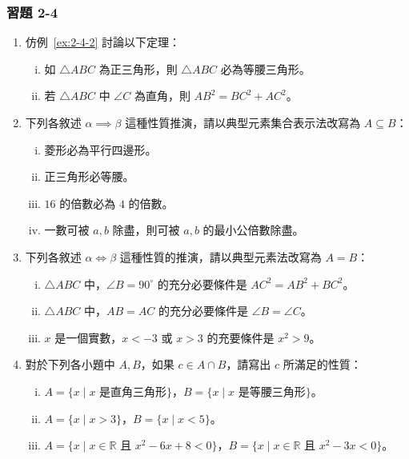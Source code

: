 \subsubsection*{習題 2-4}\label{sec:ex2-4}

\begin{enumerate}[1., leftmargin=2em]
  \item 仿例~\ref{ex:2-4-2} 討論以下定理：
  \begin{enumerate}[(i)]
    \item 如 $\triangle ABC$ 為正三角形，則 $\triangle ABC$ 必為等腰三角形。
    \item 若 $\triangle ABC$ 中 $\angle C$ 為直角，則 $AB^2 = BC^2 + AC^2$。
  \end{enumerate}
  \item 下列各敘述 $\alpha \implies \beta$ 這種性質推演，請以典型元素集合表示法改寫為 $A \subseteq B$：
  \begin{enumerate}[(i)]
    \item 菱形必為平行四邊形。
    \item 正三角形必等腰。
    \item $16$ 的倍數必為 $4$ 的倍數。
    \item 一數可被 $a, b$ 除盡，則可被 $a, b$ 的最小公倍數除盡。
  \end{enumerate}
  \item 下列各敘述 $\alpha \iff \beta$ 這種性質的推演，請以典型元素法改寫為 $A = B$：
  \begin{enumerate}[(i)]
    \item $\triangle ABC$ 中，$\angle B = 90^\circ$ 的充分必要條件是 $AC^2 = AB^2 + BC^2$。
    \item $\triangle ABC$ 中，$AB = AC$ 的充分必要條件是 $\angle B = \angle C$。
    \item $x$ 是一個實數，$x < -3$ 或 $x > 3$ 的充要條件是 $x^2 > 9$。
  \end{enumerate}
  \item 對於下列各小題中 $A, B$，如果 $c \in A \cap B$，請寫出 $c$ 所滿足的性質：
  \begin{enumerate}[(i)]
    \item $A = \{x \mid x \text{ 是直角三角形}\}$，$B = \{x \mid x \text{ 是等腰三角形}\}$。
    \item $A = \{x \mid x > 3\}$，$B = \{x \mid x < 5\}$。
    \item $A = \{x \mid x \in \mathbb{R} \text{ 且 } x^2 - 6x + 8 < 0\}$，$B = \{x \mid x \in \mathbb{R} \text{ 且 } x^2 - 3x < 0\}$。

\end{enumerate}
\end{enumerate}
